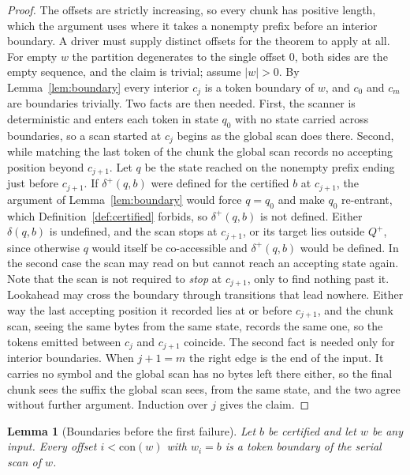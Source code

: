 \documentclass[11pt,a4paper]{article}
\theoremstyle{definition}
\theoremstyle{plain}
\newtheorem{lemma}{Lemma}
\begin{document}
\begin{proof} The offsets are strictly increasing, so every chunk has positive length, which the argument uses where it
takes a nonempty prefix before an interior boundary. A driver must supply distinct offsets for the theorem to apply at
all. For empty $w$ the partition degenerates to the single offset $0$, both sides are the empty sequence, and the claim
is trivial; assume $|w| > 0$. By Lemma~\ref{lem:boundary} every interior $c_j$ is a token boundary of $w$, and $c_0$ and
$c_m$ are boundaries trivially. Two facts are then needed. First, the scanner is deterministic and enters each token in
state $q_0$ with no state carried across boundaries, so a scan started at $c_j$ begins as the global scan does there.
Second, while matching the last token of the chunk the global scan records no accepting position beyond $c_{j+1}$. Let
$q$ be the state reached on the nonempty prefix ending just before $c_{j+1}$. If $\delta^+(q, b)$ were defined for the
certified $b$ at $c_{j+1}$, the argument of Lemma~\ref{lem:boundary} would force $q = q_0$ and make $q_0$ re-entrant,
which Definition~\ref{def:certified} forbids, so $\delta^+(q, b)$ is not defined. Either $\delta(q, b)$ is undefined,
and the scan stops at $c_{j+1}$, or its target lies outside $Q^+$, since otherwise $q$ would itself be co-accessible and
$\delta^+(q, b)$ would be defined. In the second case the scan may read on but cannot reach an accepting state again.
Note that the scan is not required to \emph{stop} at $c_{j+1}$, only to find nothing past it. Lookahead may cross the
boundary through transitions that lead nowhere. Either way the last accepting position it recorded lies at or before
$c_{j+1}$, and the chunk scan, seeing the same bytes from the same state, records the same one, so the tokens emitted
between $c_j$ and $c_{j+1}$ coincide. The second fact is needed only for interior boundaries. When $j + 1 = m$ the right
edge is the end of the input. It carries no symbol and the global scan has no bytes left there either, so the final
chunk sees the suffix the global scan sees, from the same state, and the two agree without further argument. Induction
over $j$ gives the claim.
\end{proof}

\begin{lemma}[Boundaries before the first failure]
\label{lem:prefix}
Let $b$ be certified and let $w$ be any input. Every offset $i < \mathrm{con}(w)$ with $w_i = b$ is a token boundary of
the serial scan of $w$.
\end{lemma}
\end{document}
